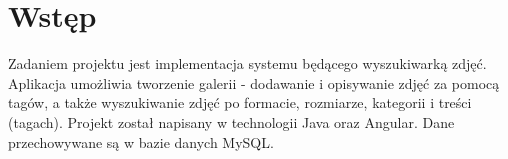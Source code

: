 {\let\clearpage\relax \section{Wstęp}}
Zadaniem projektu jest implementacja systemu będącego wyszukiwarką zdjęć. Aplikacja umożliwia tworzenie galerii - dodawanie i opisywanie zdjęć za pomocą tagów, a także wyszukiwanie zdjęć po formacie, rozmiarze, kategorii i treści (tagach). Projekt został napisany w technologii Java oraz Angular. Dane przechowywane są w bazie danych MySQL.
